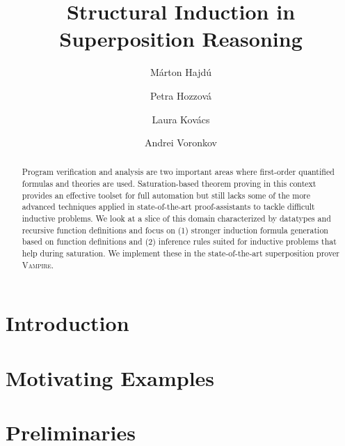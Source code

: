 \documentclass[runningheads]{llncs}
\begin{document}
%
\title{Structural Induction in Superposition Reasoning}
%
\titlerunning{ }
%
\author{M\'arton Hajd\'{u} \and Petra Hozzov\'a \and
  Laura Kov\'acs \and Andrei Voronkov}
%
\authorrunning{ }
%

%

\maketitle              %
%
\begin{abstract}

Program verification and analysis are two important areas where first-order quantified formulas and theories are used. Saturation-based theorem proving in this context provides an effective toolset for full automation but still lacks some of the more advanced techniques applied in state-of-the-art proof-assistants to tackle difficult inductive problems. We look at a slice of this domain characterized by datatypes and recursive function definitions and focus on (1) stronger induction formula generation based on function definitions and (2) inference rules suited for inductive problems that help during saturation. We implement these in the state-of-the-art superposition prover \textsc{Vampire}.
\end{abstract}

\section{Introduction}


\section{Motivating Examples}
\label{sec:motivating}


\section{Preliminaries}
\label{sec:preliminaries}

\end{document}
